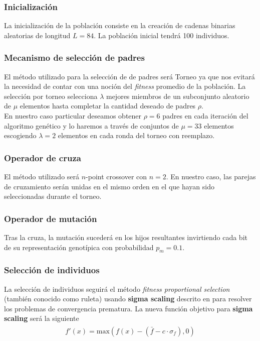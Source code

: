 \documentclass[10pt,letterpaper]{article}
\begin{document}
\subsubsection{Inicialización}

La inicialización de la población consiste en la creación de cadenas binarias
aleatorias de longitud $L=84$. La población inicial tendrá 100 individuos.

\subsubsection{Mecanismo de selección de padres}

El método utilizado para la selección de de padres será Torneo ya que nos evitará
la necesidad de contar con una noción del \textit{fitness} promedio de la población.
La selección por torneo selecciona $\lambda$ mejores miembros de un subconjunto 
aleatorio de $\mu$ elementos hasta completar la cantidad deseado de padres $\rho$. \\

En nuestro caso particular deseamos obtener $\rho=6$ padres en cada iteración del
algoritmo genético y lo haremos a través de conjuntos de $\mu=33$ elementos escogiendo
$\lambda=2$ elementos en cada ronda del torneo con reemplazo.

\subsubsection{Operador de cruza}

El método utilizado será $n$-point crossover con $n=2$. En nuestro caso, las parejas
de cruzamiento serán unidas en el mismo orden en el que hayan sido seleccionadas durante
el torneo.

\subsubsection{Operador de mutación}

Tras la cruza, la mutación sucederá en los hijos resultantes invirtiendo cada bit
de su representación genotípica con probabilidad $p_m=0.1$.

\subsubsection{Selección de individuos}

La selección de individuos seguirá el método \textit{fitness proportional selection}
(también conocido como ruleta) usando \textbf{sigma scaling} descrito en \cite{iec}
para resolver los problemas de convergencia prematura. La nueva función objetivo
para \textbf{sigma scaling} será la siguiente
    \begin{equation*} \begin{split} \begin{gathered}
        f'(x) = \mathrm{max}(f(x) - (\bar{f} - c \cdot \sigma_f), 0 )
    \end{gathered} \end{split} \end{equation*}
\end{document}
